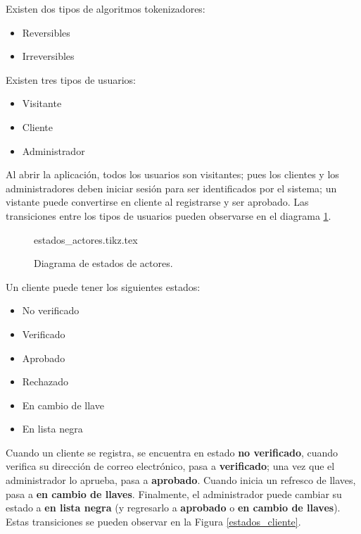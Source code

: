 {
  Existen dos tipos de algoritmos tokenizadores:
  \begin{itemize}
    \item Reversibles
    \item Irreversibles
  \end{itemize}
}

{
  Existen tres tipos de usuarios:
  \begin{itemize}
    \item Visitante
    \item Cliente
    \item Administrador
  \end{itemize}

  \begin{hangparas}{2em}{0}
    Al abrir la aplicación, todos los usuarios son visitantes; pues los clientes
    y los administradores deben iniciar sesión para ser identificados por el
    sistema; un vistante puede convertirse en cliente al registrarse y ser
    aprobado. Las transiciones entre los tipos de usuarios pueden observarse en
    el diagrama \ref{estados_actores}.
  \end{hangparas}
}

\begin{figure}
  \begin{center}
    {estados_actores.tikz.tex}
    \caption{Diagrama de estados de actores.}
    \label{estados_actores}
  \end{center}
\end{figure}


{
  Un cliente puede tener los siguientes estados:
  \begin{itemize}
    \item No verificado
    \item Verificado
    \item Aprobado
    \item Rechazado
    \item En cambio de llave
    \item En lista negra
  \end{itemize}

  \begin{hangparas}{2em}{0}
    Cuando un cliente se registra, se encuentra en estado \textbf{no verificado},
    cuando verifica su dirección de correo electrónico, pasa a
    \textbf{verificado}; una vez que el administrador lo aprueba, pasa a
    \textbf{aprobado}. Cuando inicia un refresco de llaves, pasa a
    \textbf{en cambio de llaves}. Finalmente, el administrador puede cambiar su
    estado a \textbf{en lista negra} (y regresarlo a \textbf{aprobado} o
    \textbf{en cambio de llaves}). Estas transiciones se pueden observar en la
    Figura \ref{estados_cliente}.
  \end{hangparas}
}

